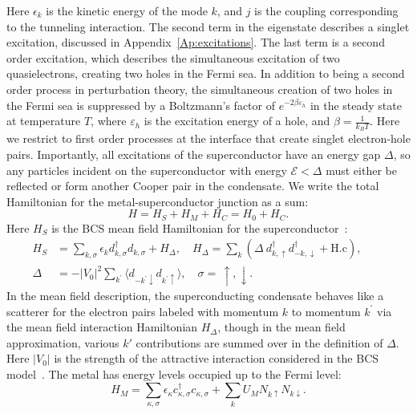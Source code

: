 \documentclass[12pt,letterpaper,aps,onecolumn,superscriptaddress,floatfix,notitlepage]{revtex4-1}
\begin{document}
	Here $\epsilon_{k}$ is the kinetic energy of the mode $k$, and $j$ is the coupling corresponding to the tunneling interaction.	The second term in the eigenstate describes a singlet excitation, discussed in Appendix~\ref{Ap:excitations}. The last term is a second order excitation, which describes the simultaneous excitation of two quasielectrons, creating two holes in the Fermi sea. In addition to being a second order process in perturbation theory, the simultaneous creation of two holes in the Fermi sea is suppressed by a Boltzmann's factor of $e^{-2\beta\varepsilon_{h}}$ in the steady state at temperature $T$, where $\varepsilon_{h}$ is the excitation energy of a hole, and $\beta = \frac{1}{k_{B}T}$. Here we restrict to first order processes at the interface that create singlet electron-hole pairs. Importantly, all excitations of the superconductor have an energy gap $\Delta$, so any particles incident on the superconductor with energy $\mathcal{E}<\Delta$ must either be reflected or form another Cooper pair in the condensate. We write the total Hamiltonian  for the metal-superconductor junction as a sum:
	\begin{equation}
	H = H_{S}+H_{M}+H_{C} = H_{0}+H_{C}.
	\end{equation}	    
	Here $H_{S}$ is the BCS mean field Hamiltonian for the superconductor~\cite{BCS}:
	\begin{align}\label{hs} H_{S} &=\sum\limits_{k,\sigma} \epsilon_{k}d_{k,\sigma}^{\dagger}d_{k,\sigma}+H_{\Delta}, \quad H_{\Delta}=\sum\limits_{k}(\Delta ~d_{k,\uparrow}^{\dagger}d_{-k,\downarrow}^{\dagger}+\text{H.c}),\qquad\nonumber\\
	\Delta &= -|V_{0}|^{2}\sum\limits_{k^{'}}\langle d_{-k^{'}\downarrow}d_{k^{'}\uparrow}\rangle, \quad \sigma=\,\uparrow,\downarrow.
	\end{align}
	In the mean field description, the superconducting condensate behaves like a scatterer for the electron pairs labeled with momentum $k$ to momentum $k^{'}$ via the mean field interaction Hamiltonian $H_{\Delta}$, though in the mean field approximation, various $k'$ contributions are summed over in the definition of $\Delta$. Here $|V_{0}|$ is the strength of the attractive interaction considered in the BCS model~\cite{annett2004superconductivity}. The metal has energy levels occupied up to the Fermi level: 
	\begin{equation}
	H_{M} = \sum\limits_{\kappa, \sigma}\epsilon_{\kappa}c_{\kappa,\sigma}^{\dagger}c_{\kappa,\sigma}+\sum\limits_{k}U_{M}N_{k\uparrow}N_{k\downarrow}.
	\end{equation}
\end{document}

